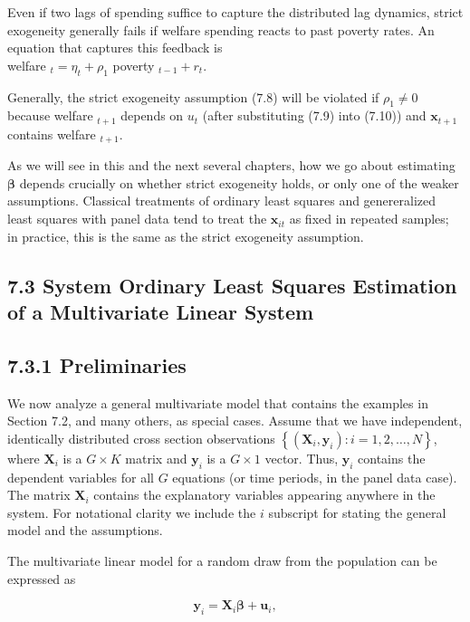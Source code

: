\documentclass[10pt]{article}
\begin{document}
Even if two lags of spending suffice to capture the distributed lag dynamics, strict exogeneity generally fails if welfare spending reacts to past poverty rates. An equation that captures this feedback is\\
welfare $_{t}=\eta_{t}+\rho_{1}$ poverty $_{t-1}+r_{t}$.

Generally, the strict exogeneity assumption (7.8) will be violated if $\rho_{1} \neq 0$ because welfare $_{t+1}$ depends on $u_{t}$ (after substituting (7.9) into (7.10)) and $\mathbf{x}_{t+1}$ contains welfare $_{t+1}$.

As we will see in this and the next several chapters, how we go about estimating $\boldsymbol{\beta}$ depends crucially on whether strict exogeneity holds, or only one of the weaker assumptions. Classical treatments of ordinary least squares and genereralized least squares with panel data tend to treat the $\mathbf{x}_{i t}$ as fixed in repeated samples; in practice, this is the same as the strict exogeneity assumption.

\subsection*{7.3 System Ordinary Least Squares Estimation of a Multivariate Linear System}
\subsection*{7.3.1 Preliminaries}
We now analyze a general multivariate model that contains the examples in Section 7.2, and many others, as special cases. Assume that we have independent, identically distributed cross section observations $\left\{\left(\mathbf{X}_{i}, \mathbf{y}_{i}\right): i=1,2, \ldots, N\right\}$, where $\mathbf{X}_{i}$ is a $G \times K$ matrix and $\mathbf{y}_{i}$ is a $G \times 1$ vector. Thus, $\mathbf{y}_{i}$ contains the dependent variables for all $G$ equations (or time periods, in the panel data case). The matrix $\mathbf{X}_{i}$ contains the explanatory variables appearing anywhere in the system. For notational clarity we include the $i$ subscript for stating the general model and the assumptions.

The multivariate linear model for a random draw from the population can be expressed as


\begin{equation*}
\mathbf{y}_{i}=\mathbf{X}_{i} \boldsymbol{\beta}+\mathbf{u}_{i}, \tag{7.11}
\end{equation*}
\end{document}
